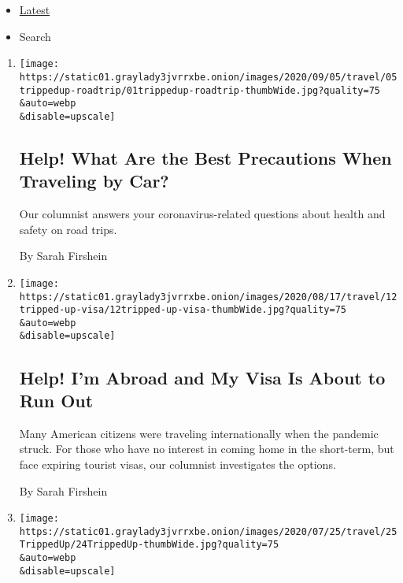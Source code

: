 \begin{itemize}
\tightlist
\item
  \protect\hyperlink{stream-panel}{Latest}
\item
  Search
\end{itemize}

\begin{enumerate}
\def\labelenumi{\arabic{enumi}.}
\item
  \href{/2020/09/01/travel/road-trip-safety.html}{}

  \texttt{[image: https://static01.graylady3jvrrxbe.onion/images/2020/09/05/travel/05trippedup-roadtrip/01trippedup-roadtrip-thumbWide.jpg?quality=75\\\&auto=webp\\\&disable=upscale]}

  \hypertarget{help-what-are-the-best-precautions-when-traveling-by-car}{%
  \subsection{Help! What Are the Best Precautions When Traveling by
  Car?}\label{help-what-are-the-best-precautions-when-traveling-by-car}}

  Our columnist answers your coronavirus-related questions about health
  and safety on road trips.

  By Sarah Firshein
\item
  \href{/2020/08/12/travel/virus-visa-extensions.html}{}

  \texttt{[image: https://static01.graylady3jvrrxbe.onion/images/2020/08/17/travel/12tripped-up-visa/12tripped-up-visa-thumbWide.jpg?quality=75\\\&auto=webp\\\&disable=upscale]}

  \hypertarget{help-im-abroad-and-my-visa-is-about-to-run-out}{%
  \subsection{Help! I'm Abroad and My Visa Is About to Run
  Out}\label{help-im-abroad-and-my-visa-is-about-to-run-out}}

  Many American citizens were traveling internationally when the
  pandemic struck. For those who have no interest in coming home in the
  short-term, but face expiring tourist visas, our columnist
  investigates the options.

  By Sarah Firshein
\item
  \href{/2020/07/22/travel/virus-cruise-refunds.html}{}

  \texttt{[image: https://static01.graylady3jvrrxbe.onion/images/2020/07/25/travel/25TrippedUp/24TrippedUp-thumbWide.jpg?quality=75\\\&auto=webp\\\&disable=upscale]}


\end{enumerate}
